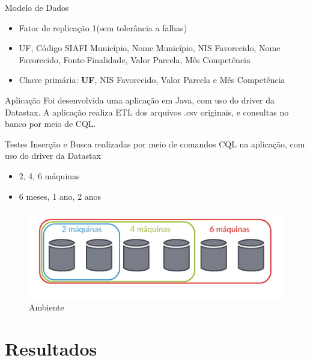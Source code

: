 \begin{frame}{Modelo de Dados}
	\begin{itemize}
		\item Fator de replicação 1(sem tolerância a falhas)
		\item UF, Código SIAFI Município, Nome Município, NIS Favorecido, Nome Favorecido, Fonte-Finalidade,
		Valor Parcela, Mês Competência
		\item Chave primária: \textbf{UF}, NIS Favorecido,
		Valor Parcela e Mês Competência
	\end{itemize}
	
\end{frame}

\begin{frame}{Aplicação}
	Foi desenvolvida uma aplicação em Java, com uso do driver da Datastax.
	A aplicação realiza ETL dos arquivos .csv originais, e consultas no banco por meio de CQL.
\end{frame}

\begin{frame}{Testes}
	Inserção e Busca realizadas por meio de comandos CQL na aplicação, com uso do driver da Datastax
	\begin{itemize}
		\item 2, 4, 6 máquinas
		\item 6 meses, 1 ano, 2 anos
	\end{itemize}

	\begin{figure}[!htb]
		\centering
		\includegraphics[width=1\textwidth]{../figuras/ambiente.jpg}
		\caption{Ambiente}
		\label{fig:graphinsert}
	\end{figure}

\end{frame}

\section{Resultados}

